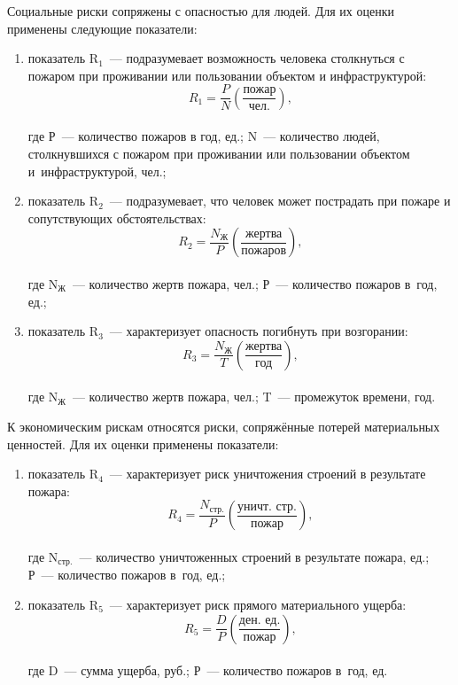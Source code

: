 Социальные риски сопряжены с опасностью для людей. Для их оценки применены следующие показатели:
\begin{enumerate}[noitemsep]\vspace{-8pt}
  \item показатель R$_1$~--- подразумевает возможность человека столкнуться с пожаром при проживании или пользовании объектом и инфраструктурой:\\
  $$R_{1}=\frac{P}{N}\left(\dfrac{\text{пожар}}{\text{чел.}}\right),$$\\
  где Р~--- количество пожаров в год, ед.; N~--- количество людей, столкнувшихся с пожаром при проживании или пользовании объектом и~инфраструктурой, чел.;
  \item показатель R$_2$~--- подразумевает, что человек может пострадать при пожаре и сопутствующих обстоятельствах:\\
  $$R_{2}=\frac{N_\text{Ж}}{P}\left(\dfrac{\text{жертва}}{\text{пожаров}}\right),$$\\
  где N$_\text{Ж}$~--- количество жертв пожара, чел.; Р~--- количество пожаров в~год, ед.;
  \clearpage
  \item показатель R$_3$~--- характеризует опасность погибнуть при возгорании:\\
    $$R_{3}=\frac{N_\text{Ж}}{T}\left(\dfrac{\text{жертва}}{\text{год}}\right),$$\\
    где N$_\text{Ж}$~--- количество жертв пожара, чел.; T~--- промежуток времени, год.
\end{enumerate}
 \vspace{-8pt}

К экономическим рискам относятся риски, сопряжённые потерей материальных ценностей. Для их оценки применены показатели:
\begin{enumerate}[noitemsep]\vspace{-8pt}
  \item показатель R$_4$~--- характеризует риск уничтожения строений в результате пожара:\\
  $$R_{4}=\frac{N_\text{стр.}}{P}\left(\dfrac{\text{уничт. стр.}}{\text{пожар}}\right),$$\\
  где N$_\text{стр.}$~---  количество уничтоженных строений в результате пожара, ед.; Р~--- количество пожаров в~год, ед.;
  \item показатель R$_5$~--- характеризует риск прямого материального ущерба:\\
  $$R_{5}=\frac{D}{P}\left(\dfrac{\text{ден. ед.}}{\text{пожар}}\right),$$\\
    где D~--- сумма ущерба, руб.; Р~--- количество пожаров в~год, ед.
\end{enumerate}
 \vspace{-8pt}

